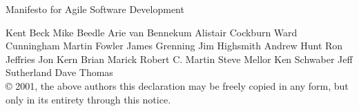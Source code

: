 \begin{frame}{\large Manifesto for Agile Software Development}
  \begin{block}{}
    {\tiny
      Kent Beck\hspace{5pt}
      Mike Beedle\hspace{5pt}
      Arie van Bennekum\hspace{5pt}
      Alistair Cockburn\hspace{5pt}
      Ward Cunningham\hspace{5pt}
      Martin Fowler\hspace{5pt}
      James Grenning\hspace{5pt}
      Jim Highsmith\hspace{5pt}
      Andrew Hunt\hspace{5pt}
      Ron Jeffries\hspace{5pt}
      Jon Kern\hspace{5pt}
      Brian Marick\hspace{5pt}
      Robert C. Martin\hspace{5pt}
      Steve Mellor\hspace{5pt}
      Ken Schwaber\hspace{5pt}
      Jeff Sutherland\hspace{5pt}
      Dave Thomas\\
      © 2001, the above authors
      this declaration may be freely copied in any form, but only in its entirety through this notice.}
  \end{block}

\end{frame}
